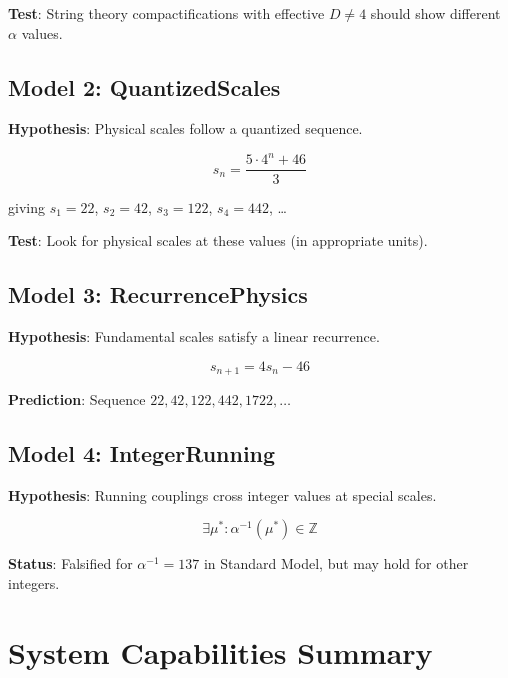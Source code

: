 \documentclass[11pt,a4paper]{article}
\begin{document}
\textbf{Test}: String theory compactifications with effective $D \neq 4$ should show different $\alpha$ values.

\subsection{Model 2: QuantizedScales}

\textbf{Hypothesis}: Physical scales follow a quantized sequence.

\begin{equation}
s_n = \frac{5 \cdot 4^n + 46}{3}
\end{equation}

giving $s_1 = 22$, $s_2 = 42$, $s_3 = 122$, $s_4 = 442$, \ldots

\textbf{Test}: Look for physical scales at these values (in appropriate units).

\subsection{Model 3: RecurrencePhysics}

\textbf{Hypothesis}: Fundamental scales satisfy a linear recurrence.

\begin{equation}
s_{n+1} = 4 s_n - 46
\end{equation}

\textbf{Prediction}: Sequence $22, 42, 122, 442, 1722, \ldots$

\subsection{Model 4: IntegerRunning}

\textbf{Hypothesis}: Running couplings cross integer values at special scales.

\begin{equation}
\exists \mu^* : \alpha^{-1}(\mu^*) \in \mathbb{Z}
\end{equation}

\textbf{Status}: Falsified for $\alpha^{-1} = 137$ in Standard Model, but may hold for other integers.

\section{System Capabilities Summary}
\end{document}
